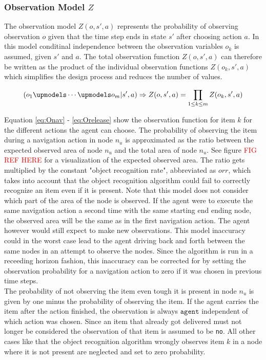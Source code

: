 \subsubsection{Observation Model $Z$}
The observation model $Z(o, s', a)$ represents the probability of observing observation $o$ given that the time step ends in state $s'$ after choosing action $a$. In this model conditinal independence between the observation variables $o_k$ is assumed, given $s'$ and $a$. The total observation function $Z(o, s', a)$ can therefore be written as the product of the individual observation functions $Z(o_k, s', a)$ which simplifies the design process and reduces the number of values.

\begin{equation}\label{eq:Ocondind}
    \left(o_1 \upmodels \cdots \upmodels o_m |s', a\right) \Rightarrow Z(o,s',a) = \prod_{1\leq k \leq m}Z(o_k,s',a)
\end{equation}

Equation \ref{eq:Onav} - \ref{eq:Orelease} show the observation function for item $k$ for the different actions the agent can choose. The probability of observing the item during a navigation action in node $n_u$ is approximated as the ratio between the expected observed area of node $n_u$ and the total area of node $n_u$. See figure \textcolor{red}{FIG REF HERE} for a visualization of the expected observed area. The ratio gets multiplied by the constant "object recognition rate", abbreviated as $orr$, which takes into account that the object recognition algorithm could fail to correctly recognize an item even if it is present. Note that this model does not consider which part of the area of the node is observed. If the agent were to execute the same navigation action a second time with the same starting end ending node, the observed area will be the same as in the first navigation action. The agent however would still expect to make new observations. This model inaccuracy could in the worst case lead to the agent driving back and forth between the same nodes in an attempt to observe the nodes. Since the algorithm is run in a receeding horizon fashion, this inaccuracy can be corrected for by setting the observation probability for a navigation action to zero if it was chosen in previous time steps.\\
The probability of not observing the item even tough it is present in node $n_u$ is given by one minus the probability of observing the item. If the agent carries the item after the action finished, the observation is always $\texttt{agent}$ independent of which action was chosen. Since an item that already got delivered must not longer be considered the observation of that item is assumed to be \texttt{no}. All other cases like that the object recognition algorithm wrongly observes item $k$ in a node where it is not present are neglected and set to zero probability. 

